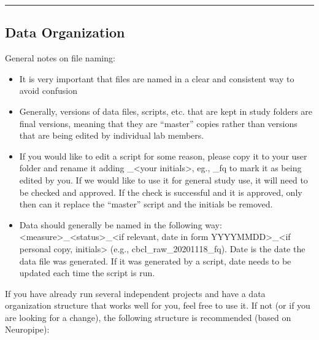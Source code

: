 \documentclass[]{book}
\providecommand{\tightlist}{%
  \setlength{\itemsep}{0pt}\setlength{\parskip}{0pt}}
\begin{document}
\begin{center}\rule{0.5\linewidth}{0.5pt}\end{center}

\hypertarget{data-organization}{%
\subsection{Data Organization}\label{data-organization}}

General notes on file naming:

\begin{itemize}
\tightlist
\item
  It is very important that files are named in a clear and consistent way to avoid confusion
\item
  Generally, versions of data files, scripts, etc. that are kept in study folders are final versions, meaning that they are ``master'' copies rather than versions that are being edited by individual lab members.
\item
  If you would like to edit a script for some reason, please copy it to your user folder and rename it adding \_\textless{}your initials\textgreater{}, eg., \_fq to mark it as being edited by you. If we would like to use it for general study use, it will need to be checked and approved. If the check is successful and it is approved, only then can it replace the ``master'' script and the initials be removed.
\item
  Data should generally be named in the following way: \textless{}measure\textgreater{}\_\textless{}status\textgreater{}\_\textless{}if relevant, date in form YYYYMMDD\textgreater{}\_\textless{}if personal copy, initials\textgreater{} (e.g., cbcl\_raw\_20201118\_fq). Date is the date the data file was generated. If it was generated by a script, date needs to be updated each time the script is run.
\end{itemize}

If you have already run several independent projects and have a data organization structure that works well for you, feel free to use it. If not (or if you are looking for a change), the following structure is recommended (based on Neuropipe):
\end{document}

